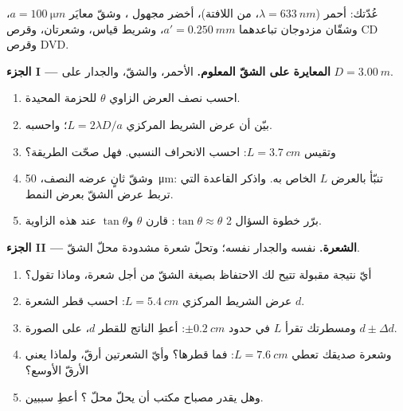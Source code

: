 \begin{problem}
\label{pb:g12:light-as-wave:1}
عُدّتك:  أحمر ($\lambda = \qty{633}{nm}$، من اللافتة)، 
أخضر مجهول ، وشقّ معايَر
$a = \qty{100}{\micro m}$، وشقّان مزدوجان تباعدهما $a' =
\qty{0.250}{mm}$، وشريط قياس، وشعرتان، وقرص CD وقرص DVD.

\medskip
\noindent\textbf{الجزء I --- المعايرة على الشقّ المعلوم.}
 الأحمر، والشقّ، والجدار على $D = \qty{3.00}{m}$.
\begin{enumerate}
  \item احسب نصف العرض الزاوي $\theta$ للحزمة المحيدة.
  \item بيّن أن عرض الشريط المركزي $L = 2\lambda D/a$؛
        واحسبه.
  \item وتقيس $L = \qty{3.7}{cm}$: احسب الانحراف
        النسبي. فهل صحّت الطريقة؟
  \item وشقّ ثانٍ عرضه النصف، \qty{50}{\micro m}: تنبّأ بالعرض
        $L$ الخاص به. واذكر القاعدة التي تربط عرض الشقّ بعرض النمط.
  \item برّر خطوة السؤال 2 $\tan\theta \approx \theta$: قارن
        $\theta$ و$\tan\theta$ عند هذه الزاوية.
\end{enumerate}

\medskip
\noindent\textbf{الجزء II --- الشعرة.}  نفسه والجدار نفسه؛ وتحلّ
شعرة مشدودة محلّ الشقّ.
\begin{enumerate}[resume]
  \item أيّ نتيجة مقبولة تتيح لك الاحتفاظ بصيغة الشقّ من أجل
        شعرة، وماذا تقول؟
  \item عرض الشريط المركزي $L = \qty{5.4}{cm}$: احسب
        قطر الشعرة $d$.
  \item ومسطرتك تقرأ $L$ في حدود $\pm\qty{0.2}{cm}$: أعطِ  الناتج
        للقطر $d$، على الصورة $d \pm \Delta d$.
  \item وشعرة صديقك تعطي $L = \qty{7.6}{cm}$: فما قطرها؟
        وأيّ الشعرتين أرقّ، ولماذا يعني الأرقّ الأوسع؟
  \item وهل يقدر مصباح مكتب أن يحلّ محلّ ؟ أعطِ سببين.
\end{enumerate}


\end{problem}
